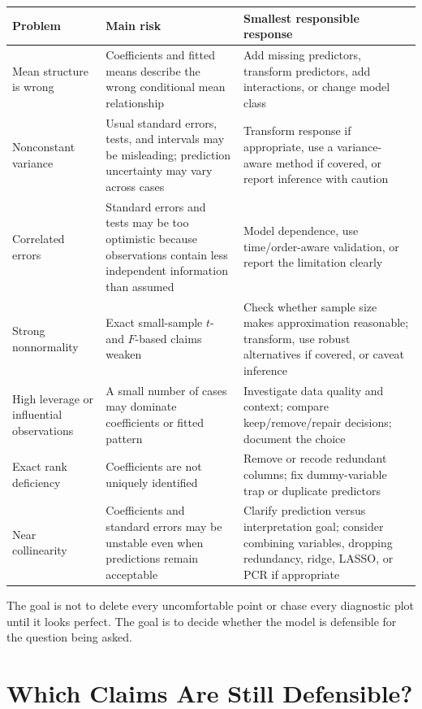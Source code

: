 \begin{center}
\begin{tabular}{>{\raggedright\arraybackslash}p{}>{\raggedright\arraybackslash}p{}>{\raggedright\arraybackslash}p{}}
\toprule
\textbf{Problem} & \textbf{Main risk} & \textbf{Smallest responsible response} \\
\midrule
Mean structure is wrong & Coefficients and fitted means describe the wrong conditional mean relationship & Add missing predictors, transform predictors, add interactions, or change model class \\
Nonconstant variance & Usual standard errors, tests, and intervals may be misleading; prediction uncertainty may vary across cases & Transform response if appropriate, use a variance-aware method if covered, or report inference with caution \\
Correlated errors & Standard errors and tests may be too optimistic because observations contain less independent information than assumed & Model dependence, use time/order-aware validation, or report the limitation clearly \\
Strong nonnormality & Exact small-sample \(t\)- and \(F\)-based claims weaken & Check whether sample size makes approximation reasonable; transform, use robust alternatives if covered, or caveat inference \\
High leverage or influential observations & A small number of cases may dominate coefficients or fitted pattern & Investigate data quality and context; compare keep/remove/repair decisions; document the choice \\
Exact rank deficiency & Coefficients are not uniquely identified & Remove or recode redundant columns; fix dummy-variable trap or duplicate predictors \\
Near collinearity & Coefficients and standard errors may be unstable even when predictions remain acceptable & Clarify prediction versus interpretation goal; consider combining variables, dropping redundancy, ridge, LASSO, or PCR if appropriate \\
\bottomrule
\end{tabular}
\end{center}

The goal is not to delete every uncomfortable point or chase every diagnostic plot until it looks perfect.  The goal is to decide whether the model is defensible for the question being asked.

\section{Which Claims Are Still Defensible?}

